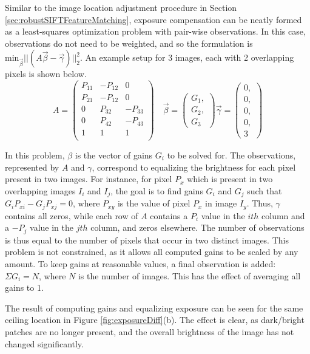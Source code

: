 \message{ !name(masters.tex)}\documentclass[]{spie}  %
\begin{document}
Similar to the image location adjustment procedure in Section
\ref{sec:robustSIFTFeatureMatching}, exposure compensation can be
neatly formed as a least-squares optimization problem with pair-wise
observations. In this case, observations do not need to be weighted,
and so the formulation is $\textrm{min}_{\vec{\beta}} ||(A \vec{\beta}
- \vec{\gamma})||_2^2 $. An example setup for 3 images, each with 2
overlapping pixels is shown below.
\[
A =
\begin{pmatrix}
  P_{11} & -P_{12} & 0\\
  P_{21} & -P_{12} & 0\\
  0 & P_{32} & -P_{33}\\
  0 & P_{42} & -P_{43}\\
  1 & 1 & 1\\

\end{pmatrix}\quad
\vec{\beta} =
\begin{pmatrix}
  G_1, \\ G_2, \\ G_3
\end{pmatrix}
\vec{\gamma} =
\begin{pmatrix}
  0, \\ 0, \\ 0, \\ 0, \\ 3
\end{pmatrix}
\]

In this problem, $\beta$ is the vector of gains $G_i$ to be solved
for.  The observations, represented by $A$ and $\gamma$, correspond to
equalizing the brightness for each pixel present in two images. For
instance, for pixel $P_x$ which is present in two overlapping images
$I_i$ and $I_j$, the goal is to find gains $G_i$ and $G_j$ such that
$G_iP_{xi} - G_jP_{xj} = 0$, where $P_{xy}$ is the value of pixel
$P_x$ in image $I_y$. Thus, $\gamma$ contains all zeros, while each
row of $A$ contains a $P_i$ value in the $ith$ column and a $-P_j$
value in the $jth$ column, and zeros elsewhere. The number of
observations is thus equal to the number of pixels that occur in two
distinct images.  This problem is not constrained, as it allows all
computed gains to be scaled by any amount. To keep gains at reasonable
values, a final observation is added: $\Sigma G_i = N$, where $N$ is
the number of images. This has the effect of averaging all gains to 1.

The result of computing gains and equalizing exposure can be seen for
the same ceiling location in Figure \ref{fig:exposureDiff}(b). The
effect is clear, as dark/bright patches are no longer present, and the
overall brightness of the image has not changed significantly.

\end{document}
